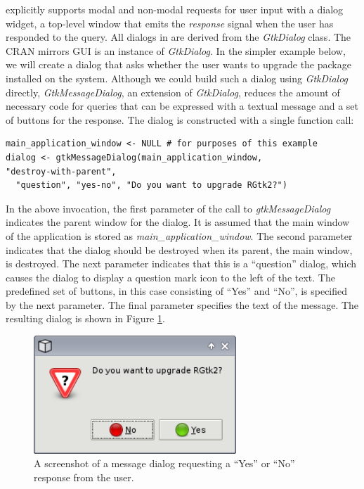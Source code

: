 \documentclass[article]{jss}
\begin{document}
 explicitly supports modal and non-modal requests for user
input with a dialog widget, a top-level window that emits the
\emph{response} signal when the user has responded to the query. All
dialogs in  are derived from the \emph{GtkDialog} class. The
CRAN mirrors GUI is an instance of \emph{GtkDialog}. In the simpler
example below,
we will create a dialog that asks whether the user wants to upgrade
the  package installed on the system. Although we could
build such a dialog using \emph{GtkDialog} directly,
\emph{GtkMessageDialog}, an extension of \emph{GtkDialog}, reduces the amount of necessary code
for queries that can be expressed with a textual message and a
set of buttons for the response. The dialog is constructed with a
single function call:
\begin{verbatim}
main_application_window <- NULL # for purposes of this example
dialog <- gtkMessageDialog(main_application_window,
"destroy-with-parent", 
  "question", "yes-no", "Do you want to upgrade RGtk2?")
\end{verbatim}
In the above invocation, the first parameter of the call to 
\emph{gtkMessageDialog} indicates the parent window for the dialog. It
is assumed that the main window of the application is stored as
\emph{main\_application\_window}. The second parameter indicates that
the dialog should be destroyed when its parent, the main window, is
destroyed.  The next parameter indicates that this is a ``question''
dialog, which causes the dialog to display a question mark icon to the
left of the text.  The predefined set of buttons, in this case
consisting of ``Yes'' and ``No'', is specified by the next
parameter. The final parameter specifies the text of the message.  The
resulting dialog is shown in Figure \ref{fig:upgrade-dialog}.

\begin{figure}
\begin{center}
\includegraphics[width=3in]{upgrade-dialog.png}
\caption{\label{fig:upgrade-dialog}A screenshot of a message dialog
requesting a 
``Yes'' or ``No'' response from the user.}
\end{center}
\end{figure}
\end{document}
